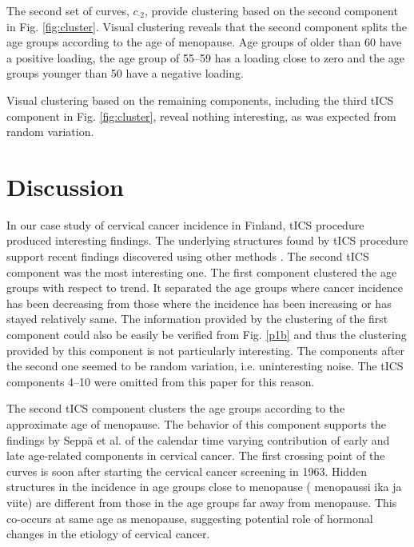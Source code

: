 \documentclass{llncs}
\begin{document}
The second set of curves, $c_{\cdot2}$, provide  clustering based on the second component in Fig. \ref{fig:cluster}. Visual clustering  reveals that the second component splits the age groups according to the age of menopause. Age groups of older than 60 have a positive loading, the age group of 55--59 has a loading close to zero and the age groups younger than 50 have a negative loading. 

Visual clustering based on the remaining components, including the third tICS component in Fig. \ref{fig:cluster}, reveal nothing interesting, as was expected from random variation.










\section{Discussion}\label{disc}

In our case study of cervical cancer incidence in Finland, tICS procedure produced interesting findings. 
The underlying structures  found by tICS procedure support recent findings discovered using other methods \cite{JP3}. The second tICS component was the most interesting one. The first component clustered the age groups with respect to trend. It separated the age groups where cancer incidence has been decreasing from those where the incidence  has been increasing or has stayed relatively same. The information provided by the clustering of the first component could also be easily be verified from Fig. \ref{p1b} and thus the clustering provided by this component is not particularly interesting. The components after the second one seemed to be random variation, i.e. uninteresting noise. The tICS components 4--10 were omitted from this paper for this reason.

The second tICS component clusters the age groups according to the approximate age of menopause. The behavior of this component supports the findings by Sepp\"{a} et al. \cite{JP3} of the calendar time varying contribution of early and late age-related components in cervical cancer.  The first crossing point of the curves is soon after starting the cervical cancer screening in 1963. Hidden structures in the incidence in age groups close to menopause ({\color{red} menopaussi ika ja viite}) are different from those in the age groups far away from menopause. This co-occurs at same age as menopause, suggesting potential role of hormonal changes in the etiology of cervical cancer. 
\end{document}
